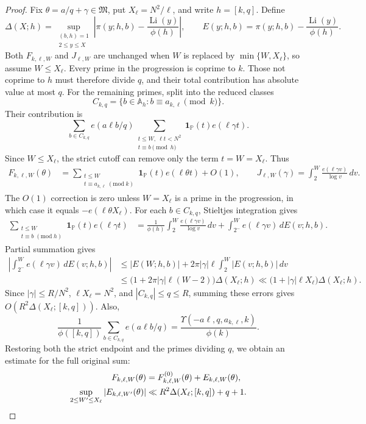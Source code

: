 \documentclass[12pt,reqno]{amsart}
\numberwithin{equation}{section}
\theoremstyle{definition}
\theoremstyle{remark}
\newcommand{\one}{\mathbf{1}}
\begin{document}
\begin{proof}
Fix \(\theta=a/q+\gamma\in\mathfrak M\), put \(X_\ell=N^2/\ell\),
and write \(h=[k,q]\). Define
\[
 \Delta(X;h)=
 \sup_{\substack{(b,h)=1\\2\leq y\leq X}}
 \left|\pi(y;h,b)-\frac{\operatorname{Li}(y)}{\phi(h)}\right|,
 \qquad
 E(y;h,b)=\pi(y;h,b)-\frac{\operatorname{Li}(y)}{\phi(h)}.
\]
Both \(F_{k,\ell,W}\) and \(J_{\ell,W}\) are unchanged when \(W\)
is replaced by \(\min\{W,X_\ell\}\), so assume \(W\leq X_\ell\).
Every prime in the progression is coprime to \(k\). Those not
coprime to \(h\) must therefore divide \(q\), and their total
contribution has absolute value at most \(q\). For the remaining
primes, split into the reduced classes
\[
 C_{k,q}
 =\{b\in\mathbb A_h:b\equiv a_{k,\ell}\pmod k\}.
\]
Their contribution is
\[
 \sum_{b\in C_{k,q}}e(a\ell b/q)
 \sum_{\substack{t\leq W,\ \ell t<N^2\\t\equiv b\pmod h}}
 \one_{\mathbb P}(t)e(\ell\gamma t).
\]
Since \(W\leq X_\ell\), the strict cutoff can remove only the term
\(t=W=X_\ell\). Thus
\begin{align*}
 F_{k,\ell,W}(\theta)
 &=
 \sum_{\substack{t\leq W\\
 t\equiv a_{k,\ell}\;(\mathrm{mod}\;k)}}
 \one_{\mathbb P}(t)e(\ell\theta t)+O(1),\qquad 
 J_{\ell,W}(\gamma)
=
 \int_2^W\frac{e(\ell\gamma v)}{\log v}\,dv.
\end{align*}
The \(O(1)\) correction is zero unless \(W=X_\ell\) is a prime
in the progression, in which case it equals
\(-e(\ell\theta X_\ell)\).
For each \(b\in C_{k,q}\), Stieltjes integration gives
\begin{align*}
 \sum_{\substack{t\leq W\\t\equiv b\;(\mathrm{mod}\;h)}}
 \one_{\mathbb P}(t)e(\ell\gamma t)
 &=
 \frac1{\phi(h)}\int_2^W\frac{e(\ell\gamma v)}{\log v}\,dv
 +\int_{2^-}^W e(\ell\gamma v)\,dE(v;h,b).
\end{align*}
Partial summation gives
\begin{align*}
 \left|
 \int_{2^-}^W e(\ell\gamma v)\,dE(v;h,b)
 \right|
 &\leq
 |E(W;h,b)|
 +2\pi|\gamma|\ell\int_2^W|E(v;h,b)|\,dv\\
 &\leq
 \bigl(1+2\pi|\gamma|\ell(W-2)\bigr)\Delta(X_\ell;h)\ll
 \bigl(1+|\gamma|\ell X_\ell\bigr)\Delta(X_\ell;h).
\end{align*}
Since \(|\gamma|\leq R/N^2\), \(\ell X_\ell=N^2\), and
\(|C_{k,q}|\leq q\leq R\), summing these errors gives
\(O(R^2\Delta(X_\ell;[k,q]))\). Also,
\[
 \frac1{\phi([k,q])}
 \sum_{b\in C_{k,q}}e(a\ell b/q)
 =
 \frac{\Upsilon(-a\ell,q,a_{k,\ell},k)}{\phi(k)}.
\]
Restoring both the strict endpoint and the primes dividing \(q\),
we obtain an estimate for the full original sum:
\begin{align}\label{e:fklwapp}
 F_{k,\ell,W}(\theta)
 &=F_{k,\ell,W}^{(0)}(\theta)+E_{k,\ell,W}(\theta),\notag\\
 \sup_{2\leq W'\leq X_\ell}|E_{k,\ell,W'}(\theta)|
 &\ll R^2\Delta(X_\ell;[k,q])+q+1.
\end{align}


\end{proof}
\end{document}
